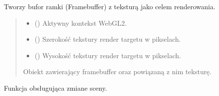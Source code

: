 \documentclass[a4paper,10pt,openany,english]{sphinxmanual}
\begin{document}

\begin{fulllineitems}
\label{\detokenize{js/js-functions:createRenderTarget}}
\pysigstartsignatures
\pysiglinewithargsret
{}
{\sphinxparamcomma {}\sphinxparamcomma {}}
{}
\pysigstopsignatures
\sphinxAtStartPar
Tworzy bufor ramki (Framebuffer) z teksturą jako celem renderowania.
\begin{quote}\begin{description}
\begin{itemize}
\item {} 
\sphinxAtStartPar
{} () \textendash{} Aktywny kontekst WebGL2.

\item {} 
\sphinxAtStartPar
{} () \textendash{} Szerokość tekstury render targetu w pikselach.

\item {} 
\sphinxAtStartPar
{} () \textendash{} Wysokość tekstury render targetu w pikselach.

\end{itemize}

\sphinxAtStartPar
{} \textendash{} \sphinxhyphen{} Obiekt zawierający framebuffer oraz powiązaną z nim teksturę.

\end{description}\end{quote}

\end{fulllineitems}


\begin{fulllineitems}
\label{\detokenize{js/js-functions:toggleScene}}
\pysigstartsignatures
\pysiglinewithargsret
{}
{}
{}
\pysigstopsignatures
\sphinxAtStartPar
Funkcja obsługująca zmiane sceny.

\end{fulllineitems}
\end{document}
